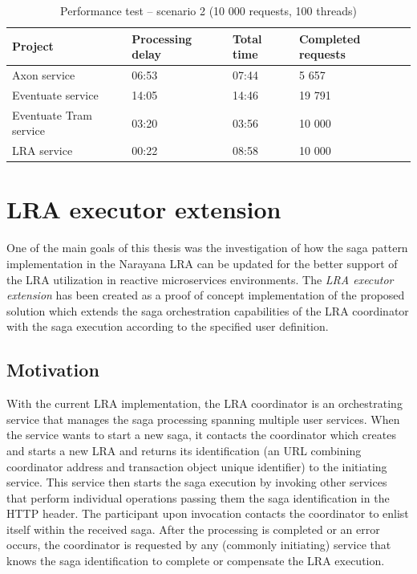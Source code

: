 \documentclass[oneside,
  digital, %
  table,   %
  lof,     %
  lot,     %
]{fithesis3}
\begin{document}
\begin{table}[h]
    \begin{tabularx}{\textwidth}{lXXX}
        \toprule
        Project & Processing delay & Total time & Completed requests \\
        \midrule
        Axon service & 06:53 & 07:44 & 5 657 \\
        Eventuate service & 14:05 & 14:46 & 19 791 \\
        Eventuate Tram service & 03:20 & 03:56 & 10 000 \\
        LRA service & 00:22 & 08:58 & 10 000 \\
        \bottomrule
    \end{tabularx}
    \caption{Performance test -- scenario 2 (10 000 requests, 100 threads)}
    \label{tab:performance-scenario-2}
\end{table}

\clearpage
\chapter{LRA executor extension}

One of the main goals of this thesis was the investigation of how the saga pattern implementation in the Narayana LRA can be updated for the better support of the LRA utilization in reactive microservices environments. The \textit{LRA executor extension} has been created as a proof of concept implementation of the proposed solution which extends the saga orchestration capabilities of the LRA coordinator with the saga execution according to the specified user definition.

\section{Motivation}

With the current LRA implementation, the LRA coordinator is an orchestrating service that manages the saga processing spanning multiple user services. When the service wants to start a new saga, it contacts the coordinator which creates and starts a new LRA and returns its identification (an URL combining coordinator address and transaction object unique identifier) to the initiating service. This service then starts the saga execution by invoking other services that perform individual operations passing them the saga identification in the HTTP header. The participant upon invocation contacts the coordinator to enlist itself within the received saga. After the processing is completed or an error occurs, the coordinator is requested by any (commonly initiating) service that knows the saga identification to complete or compensate the LRA execution.
\end{document}
